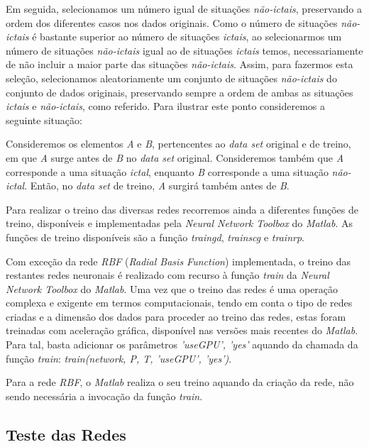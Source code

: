\documentclass{article}
\begin{document}
Em seguida, selecionamos um número igual de situações \emph{não-ictais}, preservando a ordem dos diferentes casos nos dados originais. Como o número de situações \emph{não-ictais} é bastante superior ao número de situações \emph{ictais}, ao selecionarmos um número de situações \emph{não-ictais} igual ao de situações \emph{ictais} temos, necessariamente de não incluir a maior parte das situações \emph{não-ictais}. Assim, para fazermos esta seleção, selecionamos aleatoriamente um conjunto de situações \emph{não-ictais} do conjunto de dados originais, preservando sempre a ordem de ambas as situações \emph{ictais} e \emph{não-ictais}, como referido. Para ilustrar este ponto consideremos a seguinte situação:

Consideremos os elementos \emph{A} e \emph{B}, pertencentes ao \emph{data set} original e de treino, em que \emph{A} surge antes de \emph{B} no \emph{data set} original. Consideremos também que \emph{A} corresponde a uma situação \emph{ictal}, enquanto \emph{B} corresponde a uma situação \emph{não-ictal}. Então, no \emph{data set} de treino, \emph{A} surgirá também antes de \emph{B}.

Para realizar o treino das diversas redes recorremos ainda a diferentes funções de treino, disponíveis e implementadas pela \emph{Neural Network Toolbox} do \emph{Matlab}. As funções de treino disponíveis são a função \emph{traingd}, \emph{trainscg} e \emph{trainrp}.

Com exceção da rede \emph{RBF} (\emph{Radial Basis Function}) implementada, o treino das restantes redes neuronais é realizado com recurso à função \emph{train} da \emph{Neural Network Toolbox} do \emph{Matlab}. Uma vez que o treino das redes é uma operação complexa e exigente em termos computacionais, tendo em conta o tipo de redes criadas e a dimensão dos dados para proceder ao treino das redes, estas foram treinadas com aceleração gráfica, disponível nas versões mais recentes do \emph{Matlab}. Para tal, basta adicionar os parâmetros \emph{'useGPU', 'yes'} aquando da chamada da função \emph{train}: \emph{train(network, P, T, 'useGPU', 'yes')}.

Para a rede \emph{RBF}, o \emph{Matlab} realiza o seu treino aquando da criação da rede, não sendo necessária a invocação da função \emph{train}.

\subsection{Teste das Redes}
\end{document}
